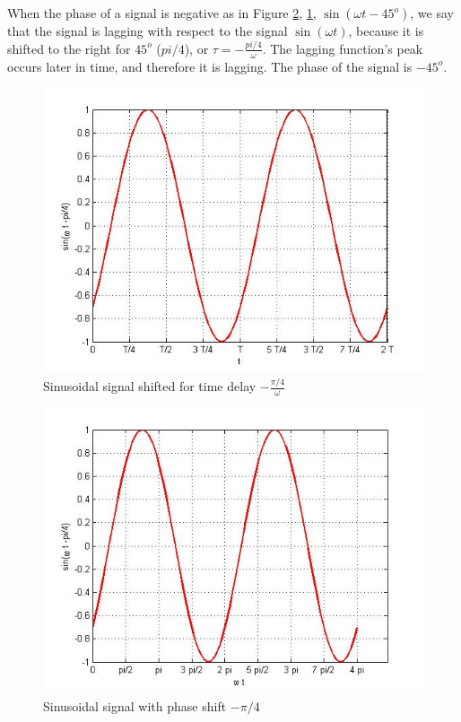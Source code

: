 \documentclass{ximera}
\begin{document}
\begin{example}
\item When the phase of a signal is negative as in Figure \ref{sinMinus45Ph}, \ref{sinMinus45T},  $ \sin (\omega t - 45^o)$, we say that the signal is lagging with respect to the signal $ \sin (\omega t)$, because it is shifted to the right for $45^o$ ($pi/4$), or $\tau=-\frac{pi/4}{\omega} $. The lagging function's peak occurs later in time, and therefore it is lagging. The phase of the signal is $-45^o$.


\begin{figure}[htbp]
\begin{center}
\includegraphics[scale=0.4]{jpg/cpef2.jpg}
\caption{ Sinusoidal signal shifted for time delay $-\frac{\pi/4}{\omega}$}
\label{sinMinus45T}
\end{center}
\end{figure}


\begin{figure}[htbp]
\begin{center}
\includegraphics[scale=0.4]{jpg/cpef4.jpg}
\caption{ Sinusoidal signal with phase shift $-\pi/4$}
\label{sinMinus45Ph}
\end{center}
\end{figure}

\end{example}
\end{document}
